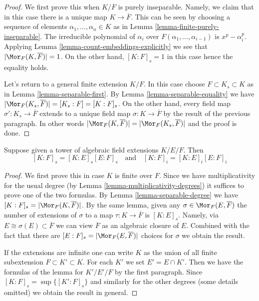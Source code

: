 \begin{proof}
We first prove this when $K/F$ is purely inseparable. Namely, we claim that
in this case there is a unique map $K \to \overline{F}$. This can be
seen by choosing a sequence of elements $\alpha_1, \ldots, \alpha_n \in K$
as in Lemma \ref{lemma-finite-purely-inseparable}. The irreducible polynomial
of $\alpha_i$ over $F(\alpha_1, \ldots, \alpha_{i - 1})$ is $x^p - \alpha_i^p$.
Applying Lemma \ref{lemma-count-embeddings-explicitly} we see that
$|\Mor_F(K, \overline{F})| = 1$. On the other hand, $[K : F]_s = 1$
in this case hence the equality holds.

\medskip\noindent
Let's return to a general finite extension $K/F$. In this case
choose $F \subset K_s \subset K$ as in Lemma \ref{lemma-separable-first}.
By Lemma \ref{lemma-separable-equality} we have
$|\Mor_F(K_s, \overline{F})| = [K_s : F] = [K : F]_s$.
On the other hand, every field map $\sigma' : K_s \to \overline{F}$
extends to a unique field map $\sigma : K \to \overline{F}$ by the
result of the previous paragraph. In other words
$|\Mor_F(K, \overline{F})| = |\Mor_F(K_s, \overline{F})|$
and the proof is done.
\end{proof}

\begin{lemma}[Multiplicativity]
\label{lemma-multiplicativity-all-degrees}
Suppose given a tower of algebraic field extensions $K/E/F$. Then
$$
[K : F]_s = [K : E]_s [E : F]_s
\quad\text{and}\quad
[K : F]_i = [K : E]_i [E : F]_i
$$
\end{lemma}

\begin{proof}
We first prove this in case $K$ is finite over $F$. Since we have
multiplicativity for the usual degree (by
Lemma \ref{lemma-multiplicativity-degrees}) it suffices to prove
one of the two formulas. By Lemma \ref{lemma-separable-degree} we have
$[K : F]_s = |\Mor_F(K, \overline{F})|$. By the same lemma,
given any $\sigma \in \Mor_F(E, \overline{F})$ the number of extensions
of $\sigma$ to a map $\tau : K \to \overline{F}$ is $[K : E]_s$.
Namely, via $E \cong \sigma(E) \subset \overline{F}$ we can view
$\overline{F}$ as an algebraic closure of $E$. Combined with the
fact that there are $[E : F]_s = |\Mor_F(E, \overline{F})|$ choices
for $\sigma$ we obtain the result.

\medskip\noindent
If the extensions are infinite one can write $K$ as the union
of all finite subextension $F \subset K' \subset K$. For each
$K'$ we set $E' = E \cap K'$. Then we have the formulas of the
lemma for $K'/E'/F$ by the first paragraph. Since
$[K : F]_s = \sup \{[K' : F]_s\}$ and similarly for the other
degrees (some details omitted) we obtain the result in general.
\end{proof}









